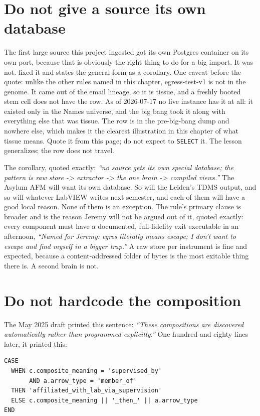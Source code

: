 \section{Do not give a source its own database}

The first large source this project ingested got its own Postgres container on its own port, because that is obviously the right thing to do for a big import. It was not.  fixed it and states the general form as a corollary. One caveat before the quote: unlike the other rules named in this chapter, egress-test-v1 is not in the genome. It came out of the email lineage, so it is tissue, and a freshly booted stem cell does not have the row. As of 2026-07-17 no live instance has it at all: it existed only in the Names universe, and the big bang took it along with everything else that was tissue. The row is in the pre-big-bang dump and nowhere else, which makes it the clearest illustration in this chapter of what tissue means. Quote it from this page; do not expect to \texttt{SELECT} it. The lesson generalizes; the row does not travel.

The corollary, quoted exactly: \textit{``no source gets its own special database; the pattern is raw store -> extractor -> the one brain -> compiled views.''} The Asylum AFM will want its own database. So will the Leiden's TDMS output, and so will whatever LabVIEW writes next semester, and each of them will have a good local reason. None of them is an exception. The rule's primary clause is broader and is the reason Jeremy will not be argued out of it, quoted exactly: every component must have a documented, full-fidelity exit executable in an afternoon, \textit{``Named for Jeremy: egres literally means escape; I don't want to escape and find myself in a bigger trap.''} A raw store per instrument is fine and expected, because a content-addressed folder of bytes is the most exitable thing there is. A second brain is not.

\section{Do not hardcode the composition}

The May 2025 draft printed this sentence: \textit{``These compositions are discovered automatically rather than programmed explicitly.''} One hundred and eighty lines later, it printed this:

\begin{lstlisting}
CASE
  WHEN c.composite_meaning = 'supervised_by'
       AND a.arrow_type = 'member_of'
  THEN 'affiliated_with_lab_via_supervision'
  ELSE c.composite_meaning || '_then_' || a.arrow_type
END
\end{lstlisting}

